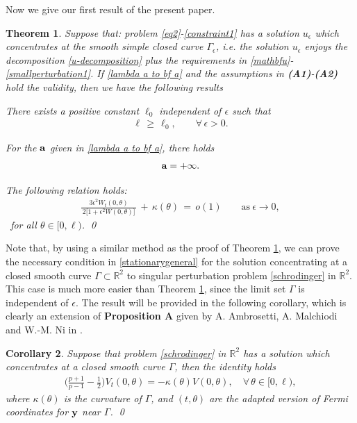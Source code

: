 \documentclass[10pt, reqno]{amsart}
\numberwithin{equation}{section}
\newtheorem{theorem}{Theorem}[section]
\newtheorem{corollary}[theorem]{Corollary}
\theoremstyle{definition}
\def\G{{\mathfrak G}}
\def\G{\Gamma}
\begin{document}
\medskip
 Now we give our first result of the present paper.

\begin{theorem} \label{necessary condition theorem}
Suppose that: problem \eqref{eq2}-\eqref{constraint1} has a solution $u_\epsilon$ which concentrates at the smooth simple closed curve $\Gamma_\epsilon$,
i.e. the solution $u_\epsilon$ enjoys the decomposition \eqref{u-decomposition} plus the requirements in \eqref{mathbfu}-\eqref{smallperturbation1}.
If \eqref{lambda a to bf a} and the assumptions in {\bf{(A1)}}-{\bf{(A2)}} hold the validity, then we have the following results

\smallskip
{}
There exists a positive constant $\ell_0$ independent of $\epsilon$ such that
\begin{align}\label{ellzero}
 \ell\,\geq\, \ell_0,\qquad \forall\,\epsilon >0.
\end{align}

\smallskip
{}
For the $\bf a$ given in \eqref{lambda a to bf a}, there holds
\begin{align}%
 {\bf a} = + \infty.
\end{align}

\smallskip
{}
The following relation holds:
\begin{align}\label{condition1}
 \frac{ 3 \epsilon^2 W_t(0, \theta)}{\, 2\big[1+\epsilon^2W(0, \theta)\big]\,}
 \,+\,
 \kappa (\theta) \,=\, o(1)
 \qquad \mbox{as}\ \epsilon\rightarrow 0,
\end{align}
\qquad\ for all $\theta \in [0, \ell)$.
\qed
\end{theorem}




\smallskip
Note that, by using a similar method as the proof of Theorem \ref{necessary condition theorem},
we can prove the necessary condition in \eqref{stationarygeneral} for the solution concentrating at a closed smooth curve $\G\subset {\mathbb R}^2$ to singular perturbation problem \eqref{schrodinger} in ${\mathbb R}^2$.
This case is much more easier than Theorem \ref{necessary condition theorem}, since the limit set $\Gamma$ is independent of $\epsilon$.
The result will be provided in the following corollary, which is clearly an extension of {\bf Proposition A} given by A. Ambrosetti, A. Malchiodi and W.-M. Ni in \cite{AMNconjecture1}.

\begin{corollary}\label{corollary2.2}
Suppose that problem \eqref{schrodinger} in ${\mathbb R}^2$ has a solution which concentrates at a closed smooth curve $\G$,
then the identity holds
\begin{align*}
 \Big(\frac{p+1} {p-1} - \frac 12\Big) V_t(0, \theta) = - \kappa (\theta)V(0, \theta), \quad \forall\, \theta \in [0, \ell),
\end{align*}
where $\kappa (\theta)$ is the curvature of $\G$, and $(t, \theta)$ are the adapted version of Fermi coordinates for ${\bf y}$ near $\G$.
\qed
\end{corollary}
\end{document}
